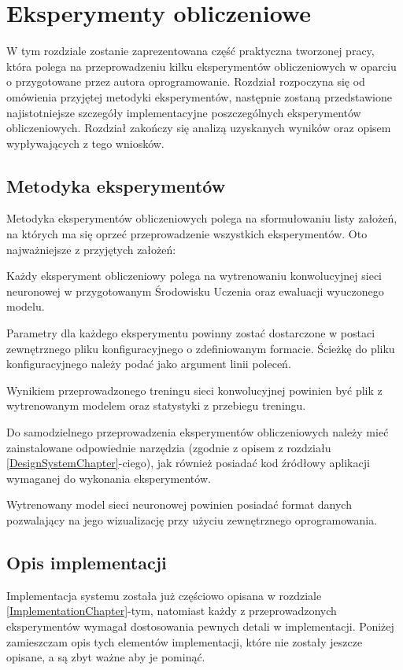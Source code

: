 \chapter{Eksperymenty obliczeniowe}
\label{ExperimentsChapter}
\vspace*{-1cm}
W tym rozdziale zostanie zaprezentowana część praktyczna tworzonej pracy, która polega na przeprowadzeniu kilku eksperymentów obliczeniowych w oparciu o przygotowane przez autora oprogramowanie. Rozdział rozpoczyna się od omówienia przyjętej metodyki eksperymentów, następnie zostaną przedstawione najistotniejsze szczegóły implementacyjne poszczególnych eksperymentów obliczeniowych. Rozdział zakończy się analizą uzyskanych wyników oraz opisem wypływających z tego wniosków.

\section{Metodyka eksperymentów}
Metodyka eksperymentów obliczeniowych polega na sformułowaniu listy założeń, na których ma się oprzeć przeprowadzenie wszystkich eksperymentów. Oto najważniejsze z przyjętych założeń:
\vspace*{-0.5cm}
\begin{enumerate*}
\item Każdy eksperyment obliczeniowy polega na wytrenowaniu konwolucyjnej sieci neuronowej w przygotowanym Środowisku Uczenia oraz ewaluacji wyuczonego modelu.
\item Parametry dla każdego eksperymentu powinny zostać dostarczone w postaci zewnętrznego pliku konfiguracyjnego o zdefiniowanym formacie. Ścieżkę do pliku konfiguracyjnego należy podać jako argument linii poleceń.
\item Wynikiem przeprowadzonego treningu sieci konwolucyjnej powinien być plik z wytrenowanym modelem oraz statystyki z przebiegu treningu.
\item Do samodzielnego przeprowadzenia eksperymentów obliczeniowych należy mieć zainstalowane odpowiednie narzędzia (zgodnie z opisem z rozdziału \ref{DesignSystemChapter}-ciego), jak również posiadać kod źródłowy aplikacji wymaganej do wykonania eksperymentów.
\item Wytrenowany model sieci neuronowej powinien posiadać format danych pozwalający na jego wizualizację przy użyciu zewnętrznego oprogramowania.
\end{enumerate*}

\section{Opis implementacji}
Implementacja systemu została już częściowo opisana w rozdziale \ref{ImplementationChapter}-tym, natomiast każdy z przeprowadzonych eksperymentów wymagał dostosowania pewnych detali w implementacji. Poniżej zamieszczam opis tych elementów implementacji, które nie zostały jeszcze opisane, a są zbyt ważne aby je pominąć.

